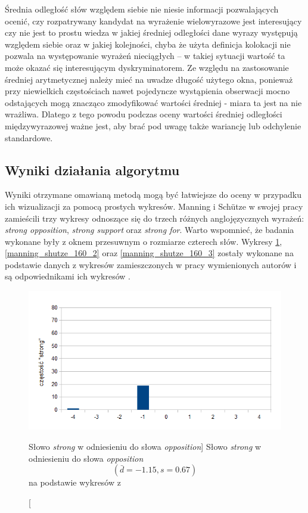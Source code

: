 \par
Średnia odległość słów względem siebie nie niesie informacji pozwalających ocenić, czy rozpatrywany kandydat na wyrażenie wielowyrazowe jest interesujący czy nie jest to prostu wiedza w jakiej średniej odległości dane wyrazy występują względem siebie oraz w jakiej kolejności, chyba że użyta definicja kolokacji nie pozwala na występowanie wyrażeń nieciągłych -- w takiej sytuacji wartość ta może okazać się interesującym dyskryminatorem.
Ze względu na zastosowanie średniej arytmetycznej należy mieć na uwadze długość użytego okna, ponieważ przy niewielkich częstościach nawet pojedyncze wystąpienia obserwacji mocno odstających mogą znacząco zmodyfikować wartości średniej - miara ta jest na nie wrażliwa.
Dlatego z tego powodu podczas oceny wartości średniej odległości międzywyrazowej ważne jest, aby brać pod uwagę także wariancję lub odchylenie standardowe.


\subsection{Wyniki działania algorytmu}
Wyniki otrzymane omawianą metodą mogą być łatwiejsze do oceny w przypadku ich wizualizacji za pomocą prostych wykresów.
Manning i Schütze w swojej pracy zamieścili trzy wykresy odnoszące się do trzech różnych anglojęzycznych wyrażeń: \emph{strong opposition}, \emph{strong support} oraz \emph{strong for}.
Warto wspomnieć, że badania wykonane były z oknem przesuwnym o rozmiarze czterech słów.
Wykresy \ref{manning_shutze_160_1}, \ref{manning_shutze_160_2} oraz \ref{manning_shutze_160_3} zostały wykonane na podstawie danych z wykresów zamieszczonych w pracy wymienionych autorów i są odpowiednikami ich wykresów \cite[str. 160]{mit}.

\begin{figure}[h!]
\centering
\includegraphics{charts/manning_shutze_160_1}
\caption
	[Słowo \emph{strong} w odniesieniu do słowa \emph{opposition}]
	{
		Słowo \emph{strong} w odniesieniu do słowa \emph{opposition} 
		\begin{displaymath}
			(\bar{d} = -1.15, s = 0.67)
		\end{displaymath}	
		na podstawie wykresów z \cite[str. 160]{mit}
	}
\label{manning_shutze_160_1}
\end{figure}

